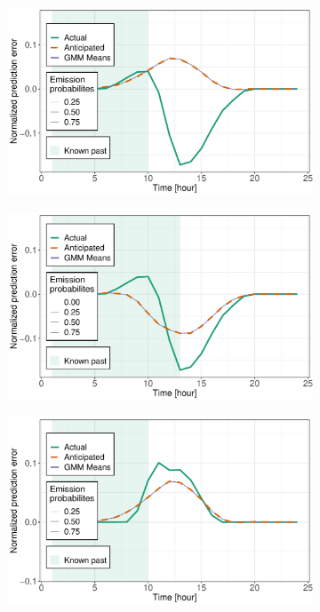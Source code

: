 \documentclass[12pt]{report}
\begin{document}
\begin{figure}[h] 
	\begin{subfigure}[b]{0.5\linewidth}
		\centering
		\includegraphics[width=0.9\linewidth]{Images/PV/GMM/GMM_6Clust_Intraday_24d_10h_idtest98.pdf} 
	\end{subfigure}%
	\begin{subfigure}[b]{0.5\linewidth}
		\centering
		\includegraphics[width=0.9\linewidth]{Images/PV/GMM/GMM_6Clust_Intraday_24d_13h_idtest98.pdf} 
	\end{subfigure}
	\centering
	\begin{subfigure}[b]{0.5\linewidth}
		\centering
		\includegraphics[width=0.9\linewidth]{Images/PV/GMM/GMM_6Clust_Intraday_24d_10h_idtest335.pdf} 
	\end{subfigure}
	

\end{figure}
\end{document}

